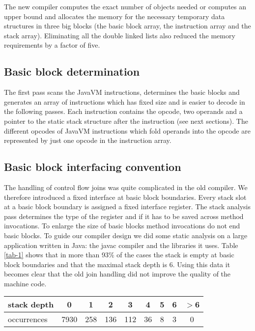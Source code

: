 The new compiler computes the exact number of objects needed or computes an
upper bound and allocates the memory for the necessary temporary data
structures in three big blocks (the basic block array, the instruction
array and the stack array). Eliminating all the double linked lists also
reduced the memory requirements by a factor of five.


\subsection{Basic block determination}

The first pass scans the JavaVM instructions, determines the basic blocks
and generates an array of instructions which has fixed size and is easier
to decode in the following passes. Each instruction contains the opcode,
two operands and a pointer to the static stack structure after the
instruction (see next sections). The different opcodes of JavaVM
instructions which fold operands into the opcode are represented by just
one opcode in the instruction array.


\subsection{Basic block interfacing convention}

The handling of control flow joins was quite complicated in the old
compiler. We therefore introduced a fixed interface at basic block
boundaries. Every stack slot at a basic block boundary is assigned a fixed
interface register. The stack analysis pass determines the type of the
register and if it has to be saved across method invocations. To enlarge
the size of basic blocks method invocations do not end basic blocks. To
guide our compiler design we did some static analysis on a large
application written in Java: the javac compiler and the libraries it uses.
Table \ref{tab-1} shows that in more than 93\% of the cases the stack is
empty at basic block boundaries and that the maximal stack depth is 6.
Using this data it becomes clear that the old join handling did not improve
the quality of the machine code.

\begin{table*}
\begin{center}
\begin{tabular}[b]{|l|c|c|c|c|c|c|c|c|}
\hline 
stack depth &   0  &  1  &  2  &  3  &  4  &  5  &  6 & $>$6 \\ \hline           
occurrences & 7930 & 258 & 136 & 112 &  36 &  8  &  3 &  0   \\ \hline           
\end{tabular}
\caption{distribution of stack depth at block boundary}
\label{tab-1}
\end{center}
\end{table*}


